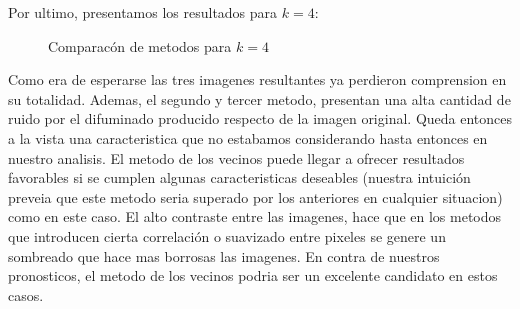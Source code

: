Por ultimo, presentamos los resultados para $k=4$:

\begin{figure}[H]
    \centering
    \qquad
    \qquad
    \caption{Comparacón de metodos para $k = 4$}
    \label{fig:example}
\end{figure}

Como era de esperarse las tres imagenes resultantes ya perdieron comprension en su totalidad. Ademas, el segundo y tercer metodo, presentan una alta cantidad de ruido por el difuminado producido respecto de la imagen original.
Queda entonces a la vista una caracteristica que no estabamos considerando hasta entonces en nuestro analisis. El metodo de los vecinos puede llegar a ofrecer resultados favorables si se cumplen algunas caracteristicas deseables (nuestra intuición preveia que este metodo seria superado por los anteriores en cualquier situacion) como en este caso. El alto contraste entre las imagenes, hace que en los metodos que introducen cierta correlación o suavizado entre pixeles se genere un sombreado que hace mas borrosas las imagenes. En contra de nuestros pronosticos, el metodo de los vecinos podria ser un excelente candidato en estos casos.


